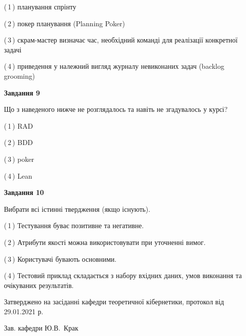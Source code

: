 \documentclass[10pt, ukrainian]{article}
\begin{document}
{\begin {large}
(\,1\,) планування спрінту%



(\,2\,) покер планування (Planning Poker)%



(\,3\,) скрам-мастер визначає час, необхідний команді для реалізації конкретної задачі%



(\,4\,) приведення у належний вигляд журналу невиконаних задач (backlog grooming) %


{\begin {center}\textbf{Завдання 9}\end {center}}\par
Що з наведеного нижче не розглядалось та навіть не згадувалось у курсі?\par
\vspace{2mm}



(\,1\,) RAD%



(\,2\,) BDD%



(\,3\,) poker%



(\,4\,) Lean%


{\begin {center}\textbf{Завдання 10}\end {center}}\par
Вибрати всі істинні твердження (якщо існують).\par
\vspace{2mm}



(\,1\,) Тестування буває позитивне та негативне.%



(\,2\,) Атрибути якості можна використовувати при уточненні вимог.%



(\,3\,) Користувачі бувають основними.%



(\,4\,) Тестовий приклад складається з набору вхідних даних, умов виконання та очікуваних результатів.%



\end {large}}
{\vspace{5mm}\smallskip \begin {small} Затверджено на засіданні кафедри теоретичної кібернетики, протокол  від   29.01.2021 р.\par\smallskip\smallskip
{\parbox {6.5 cm}{Зав. кафедри \dotfill Ю.В.~Крак}} \end{small}}
\newpage
\end{document}
